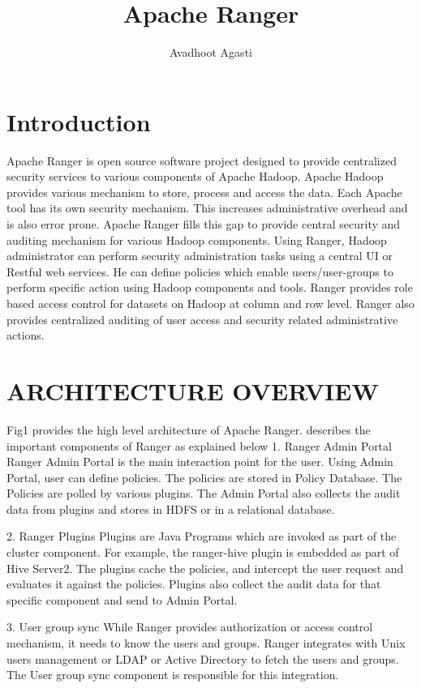 \documentclass[9pt,twocolumn,twoside]{styles/osajnl}
\title{Apache Ranger}
\author[1,*, +]{Avadhoot Agasti}
\affil[1]{School of Informatics and Computing, Bloomington, IN 47408, U.S.A.}
\affil[*]{Corresponding authors: aagasti@indiana.edu}
\affil[+]{HID - SL-IO-3000}
\begin{document}
\maketitle

\section{Introduction}

Apache Ranger is open source software project designed to provide centralized
 security services to various components of Apache Hadoop. Apache Hadoop
 provides various mechanism to store, process and access the data. Each
 Apache tool has its own security mechanism. This increases administrative
 overhead and is also error prone. Apache Ranger fills this gap to provide
 central security and auditing mechanism for various Hadoop components. Using
  Ranger, Hadoop administrator can perform security administration tasks
  using a central UI or Restful web services. He can define policies which
  enable users/user-groups to perform specific action using Hadoop components
   and tools. Ranger provides role based access control for datasets on
   Hadoop at column and row level. Ranger also provides centralized auditing
   of user access and security related administrative actions.

\section{ARCHITECTURE OVERVIEW}

Fig1 provides the high level architecture of Apache Ranger.
\cite{ww-ranger-architecture} describes the important components of Ranger as
 explained below
1. Ranger Admin Portal
Ranger Admin Portal is the main interaction point for the user. Using Admin
Portal, user can define policies. The policies are stored in Policy Database.
 The Policies are polled by various plugins. The Admin Portal also collects
 the audit data from plugins and stores in HDFS or in a relational database.

2. Ranger Plugins
Plugins are Java Programs which are invoked as part of the cluster component.
 For example, the ranger-hive plugin is embedded as part of Hive Server2. The
  plugins cache the policies, and intercept the user request and evaluates it
   against the policies. Plugins also collect the audit data for that
   specific component and send to Admin Portal.

3. User group sync
While Ranger provides authorization or access control mechanism, it needs to
know the users and groups. Ranger integrates with Unix users management or
LDAP or Active Directory to fetch the users and groups. The User group sync
component is responsible for this integration.
\end{document}
